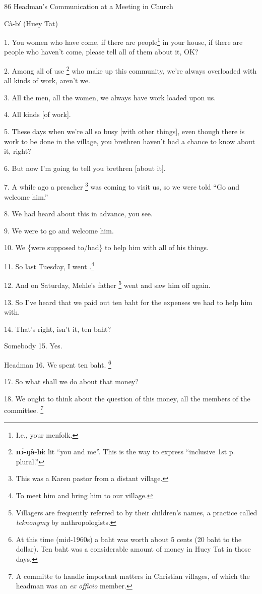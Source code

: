 
86 Headman's Communication at a Meeting in Church

Cà-bí (Huey Tat)

1. You women who have come, if there are people\footnote{I.e., your menfolk.} in your house, if there are
people who haven't come, please tell all of them about it, OK?

2. Among all of use \footnote{\textbf{nɔ̀-ŋà}꞊\textbf{hɨ}: lit ``you and me''. This is the way to express ``inclusive 1st p. plural.''} who make up this community, we're always overloaded with
all kinds of work, aren't we.

3. All the men, all the women, we always have work loaded upon us.

4. All kinds [of work].

5. These days when we're all so busy [with other things], even though there is
work to be done in the village, you brethren haven't had a chance to know about
it, right?

6. But now I'm going to tell you brethren [about it].

7. A while ago a preacher \footnote{This was a Karen pastor from a distant village.} was coming to visit us, so we were told ``Go and
welcome him.''

8. We had heard about this in advance, you see.

9. We were to go and welcome him.

10. We \{were supposed to/had\} to help him with all of his things.

11. So last Tuesday, I went .\footnote{To meet him and bring him to our village.}

12. And on Saturday, Mehle's father \footnote{Villagers are frequently referred to by their children's names, a practice called \textit{teknonymy} by anthropologists.} went and saw him off again.

13. So I've heard that we paid out ten baht for the expenses we had to help him
with.

14. That's right, isn't it, ten baht?

Somebody 15. Yes.

Headman 16. We spent ten baht. \footnote{At this time (mid-1960s) a baht was worth about 5 cents (20 baht to the dollar). Ten baht was a considerable amount of money in Huey Tat in those days.}

17. So what shall we do about that money?

18. We ought to think about the question of this money, all the members of the
committee. \footnote{A committe to handle important matters in Christian villages, of which the headman was an \textit{ex officio} member.}


